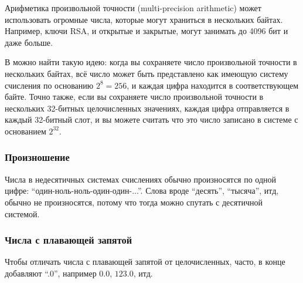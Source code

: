 Арифметика произвольной точности (multi-precision arithmetic) может использовать огромные числа,
которые могут храниться в нескольких байтах.
Например, ключи RSA, и открытые и закрытые, могут занимать до 4096 бит и даже больше.

В  можно найти такую идею: когда вы сохраняете число произвольной точности в нескольких байтах,
всё число может быть представлено как имеющую систему счисления по основанию $2^8=256$, и каждая цифра находится
в соответствующем байте.
Точно также, если вы сохраняете число произвольной точности в нескольких 32-битных целочисленных значениях,
каждая цифра отправляется в каждый 32-битный слот, и вы можете считать что это число записано в системе с основанием $2^{32}$.

\subsubsection{Произношение}

Числа в недесятичных системах счислениях обычно произносятся по одной цифре: ``один-ноль-ноль-один-один-...''.
Слова вроде ``десять'', ``тысяча'', итд, обычно не произносятся, потому что тогда можно спутать с десятичной системой.

\subsubsection{Числа с плавающей запятой}

Чтобы отличать числа с плавающей запятой от целочисленных, часто, в конце добавляют ``.0'',
например $0.0$, $123.0$, итд.

